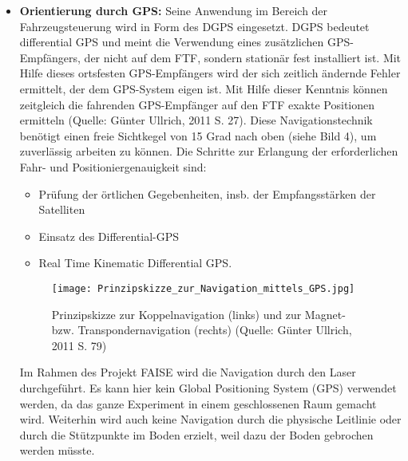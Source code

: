 \begin{itemize}
	\item \textbf{Orientierung durch GPS:} Seine Anwendung im Bereich der Fahrzeugsteuerung wird in Form des DGPS eingesetzt.
DGPS bedeutet differential GPS und meint die Verwendung eines zus\"atzlichen GPS-Empf\"angers, der nicht auf dem FTF, sondern station\"ar fest installiert ist.
Mit Hilfe dieses ortsfesten GPS-Empf\"angers wird der sich zeitlich \"andernde Fehler ermittelt, der dem GPS-System eigen ist.
Mit Hilfe dieser Kenntnis k\"onnen zeitgleich die fahrenden GPS-Empf\"anger auf den FTF exakte Positionen ermitteln (Quelle: G\"unter Ullrich, 2011 S. 27).
Diese Navigationstechnik benötigt einen freie Sichtkegel von 15 Grad nach oben (siehe Bild 4), um zuverl\"assig arbeiten zu k\"onnen.
Die Schritte zur Erlangung der erforderlichen Fahr- und Positioniergenauigkeit sind:
	\begin{itemize}
		\item Pr\"ufung der \"ortlichen Gegebenheiten, insb. der Empfangsst\"arken der Satelliten
 \item Einsatz des Differential-GPS
 \item Real Time Kinematic Differential GPS. 
\end{itemize}
	\begin{figure}[h!]
		\centering
		\texttt{[image: Prinzipskizze\_zur\_Navigation\_mittels\_GPS.jpg]}
		\caption{Prinzipskizze zur Koppelnavigation (links) und zur Magnet- bzw. Transpondernavigation (rechts) (Quelle: G\"unter Ullrich, 2011 S. 79)}
		\label{Systemarchitektur_FTS}
\end{figure}
Im Rahmen des Projekt FAISE wird die Navigation durch den Laser durchgef\"uhrt. Es kann hier kein Global Positioning System (GPS) verwendet werden, da das ganze Experiment in einem geschlossenen Raum gemacht wird.
Weiterhin wird auch keine Navigation durch die physische Leitlinie oder durch die St\"utzpunkte im Boden erzielt, weil dazu der Boden gebrochen werden m\"usste.
\end{itemize}

